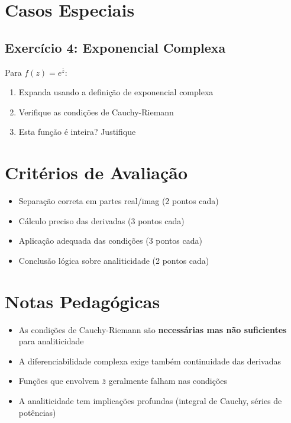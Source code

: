 \documentclass{article}
\begin{document}
\section*{Casos Especiais}
\subsection*{Exercício 4: Exponencial Complexa}
Para \( f(z) = e^{\overline{z}} \):
\begin{enumerate}
    \item Expanda usando a definição de exponencial complexa
    \item Verifique as condições de Cauchy-Riemann
    \item Esta função é inteira? Justifique
\end{enumerate}

\section*{Critérios de Avaliação}
\begin{itemize}
    \item Separação correta em partes real/imag (2 pontos cada)
    \item Cálculo preciso das derivadas (3 pontos cada)
    \item Aplicação adequada das condições (3 pontos cada)
    \item Conclusão lógica sobre analiticidade (2 pontos cada)
\end{itemize}

\section*{Notas Pedagógicas}
\begin{itemize}
    \item As condições de Cauchy-Riemann são \textbf{necessárias mas não suficientes} para analiticidade
    \item A diferenciabilidade complexa exige também continuidade das derivadas
    \item Funções que envolvem \( \overline{z} \) geralmente falham nas condições
    \item A analiticidade tem implicações profundas (integral de Cauchy, séries de potências)
\end{itemize}
\end{document}
